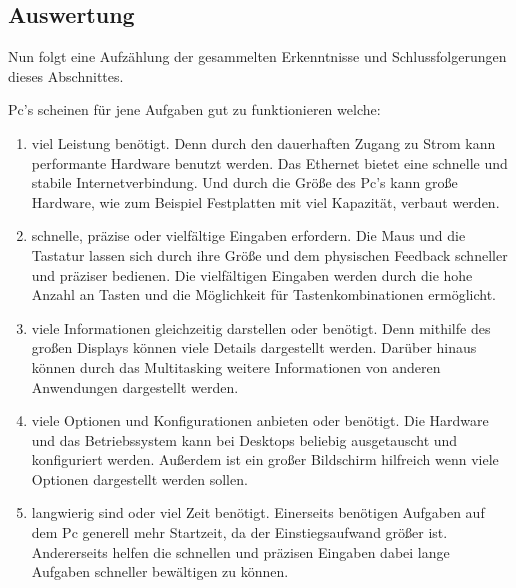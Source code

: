 \subsection{Auswertung}\myCheckmark
Nun folgt eine Aufzählung der gesammelten Erkenntnisse und Schlussfolgerungen dieses Abschnittes. %

\myNewSection
Pc's scheinen für jene Aufgaben gut zu funktionieren welche:
\begin{enumerate}%
	\item viel Leistung benötigt.\newline%
	Denn durch den dauerhaften Zugang zu Strom kann performante Hardware benutzt werden. Das Ethernet bietet eine schnelle und stabile Internetverbindung. Und durch die Größe des Pc's kann große Hardware, wie zum Beispiel Festplatten mit viel Kapazität, verbaut werden.%
	\item schnelle, präzise oder vielfältige Eingaben erfordern.\newline%
	Die Maus und die Tastatur lassen sich durch ihre Größe und dem physischen Feedback schneller und präziser bedienen. Die vielfältigen Eingaben werden durch die hohe Anzahl an Tasten und die Möglichkeit für Tastenkombinationen ermöglicht.%
	\item viele Informationen gleichzeitig darstellen oder benötigt.\newline%
	Denn mithilfe des großen Displays können viele Details dargestellt werden. Darüber hinaus können durch das Multitasking weitere Informationen von anderen Anwendungen dargestellt werden.%
	\item viele Optionen und Konfigurationen anbieten oder benötigt.\newline%
	Die Hardware und das Betriebssystem kann bei Desktops beliebig ausgetauscht und konfiguriert werden. Außerdem ist ein großer Bildschirm hilfreich wenn viele Optionen dargestellt werden sollen.%
	\item langwierig sind oder viel Zeit benötigt.\newline%
	Einerseits benötigen Aufgaben auf dem Pc generell mehr Startzeit, da der Einstiegsaufwand größer ist. Andererseits helfen die schnellen und präzisen Eingaben dabei lange Aufgaben schneller bewältigen zu können.%
\end{enumerate}%
